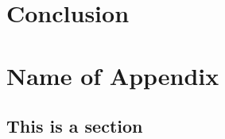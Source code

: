 \documentclass{tpk4170report}
\begin{document}
\chapter{Conclusion}

\blindtext[4]



\printbibliography[title=References]

\appendix
\chapter{Name of Appendix} 

\section{This is a section}
\end{document}
